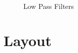 \begin{figure}[H]
  \centering
\caption{Low Pass Filters}
\label{img:lpf}
\end{figure}



\section{Layout}
\